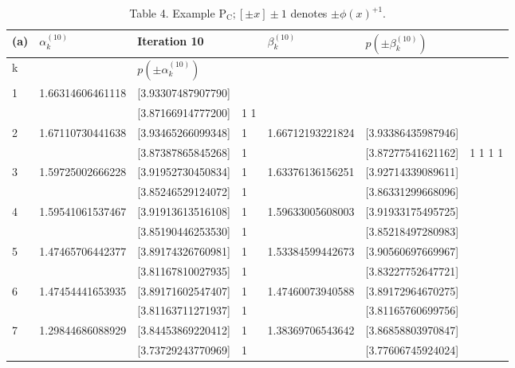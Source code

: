 \documentclass[10pt]{article}
\begin{document}
\begin{table}[h]
\begin{center}
\captionsetup{labelformat=empty}
\caption{Table 4. Example $\mathrm{P}_{\mathrm{C}} ;[ \pm x] \pm 1$ denotes $\pm \phi(x)^{+1}$.}
\begin{tabular}{|l|l|l|l|l|l|l|}
\hline
(a) & \multirow[b]{2}{*}{$\alpha_{k}^{(10)}$} & Iteration 10 &  & \multirow[b]{2}{*}{$\beta_{k}^{(10)}$} & \multirow[b]{2}{*}{$p\left( \pm \beta_{k}^{(10)}\right)$} & \multirow{4}{*}{} \\
\hline
k &  & $p\left( \pm \alpha_{k}^{(10)}\right)$ &  &  &  &  \\
\hline
1 & \multirow[t]{2}{*}{1.66314606461118} & [3.93307487907790] &  & \multirow{2}{*}{} & \multirow{2}{*}{} &  \\
\hline
 &  & [3.87166914777200] & 1 1 &  &  &  \\
\hline
\multirow[t]{2}{*}{2} & \multirow[t]{2}{*}{1.67110730441638} & [3.93465266099348] & 1 & 1.66712193221824 & [3.93386435987946] &  \\
\hline
 &  & [3.87387865845268] & 1 &  & [3.87277541621162] & 1 1 1 1 \\
\hline
3 & \multirow[t]{2}{*}{1.59725002666228} & [3.91952730450834] & 1 & 1.63376136156251 & [3.92714339089611] &  \\
\hline
 &  & [3.85246529124072] & 1 &  & [3.86331299668096] &  \\
\hline
\multirow[t]{2}{*}{4} & \multirow[t]{2}{*}{1.59541061537467} & [3.91913613516108] & 1 & 1.59633005608003 & [3.91933175495725] &  \\
\hline
 &  & [3.85190446253530] & 1 &  & [3.85218497280983] &  \\
\hline
\multirow[t]{2}{*}{5} & \multirow[t]{2}{*}{1.47465706442377} & [3.89174326760981] & 1 & 1.53384599442673 & [3.90560697669967] &  \\
\hline
 &  & [3.81167810027935] & 1 &  & [3.83227752647721] &  \\
\hline
\multirow[t]{2}{*}{6} & \multirow[t]{2}{*}{1.47454441653935} & [3.89171602547407] & 1 & 1.47460073940588 & [3.89172964670275] &  \\
\hline
 &  & [3.81163711271937] & 1 &  & [3.81165760699756] &  \\
\hline
\multirow[t]{2}{*}{7} & \multirow[t]{2}{*}{1.29844686088929} & [3.84453869220412] & 1 & 1.38369706543642 & [3.86858803970847] &  \\
\hline
 &  & [3.73729243770969] & 1 &  & [3.77606745924024] &  \\

\end{tabular}
\end{center}
\end{table}
\end{document}
